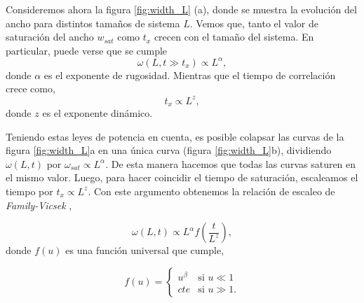 Consideremos ahora la figura \ref{fig:width_L} (a), donde se muestra la evolución del ancho para distintos tamaños de sistema $L$. Vemos que, tanto el 
valor de saturación del ancho $w_{sat}$ como $t_x$ crecen con el tamaño del sistema. En particular, puede verse que se cumple
\begin{equation}
\omega(L,t \gg t_x) \propto L^\alpha,
\end{equation}
donde $\alpha$ es el exponente de rugosidad. Mientras que el tiempo de correlación crece como,
\begin{equation}
t_x \propto L^{z},
\end{equation}
donde $z$ es el exponente dinámico.

Teniendo estas leyes de potencia en cuenta, es posible colapsar las curvas de la figura \ref{fig:width_L}a en una única curva (figura \ref{fig:width_L}b), dividiendo $\omega(L,t)$ por $\omega_{sat} \propto L^\alpha$. De esta manera hacemos que todas las curvas saturen en el mismo valor. Luego, para hacer coincidir el tiempo de saturación, escaleamos el tiempo por $t_x \propto L^{z}$. Con este argumento obtenemos la relación de escaleo de \textit{Family-Vicsek} \cite{Family_1985},

\begin{equation}
    \omega(L,t) \propto L^{\alpha} f\left(\frac{t}{L^z}\right),
\end{equation}
donde $f(u)$ es una función universal que cumple,

\begin{equation}
    f(u) =
    \begin{cases}
        u^\beta & \text{si } u \ll 1 \\
        cte & \text{si } u \gg 1.
    \end{cases}
\end{equation}

